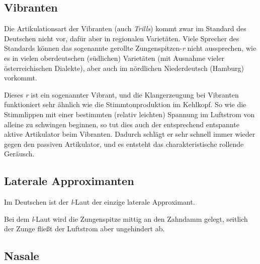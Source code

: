 \subsection[Vibranten]{\Opsional Vibranten}

Die Artikulationsart der Vibranten (auch \textit{Trills}) kommt zwar im Standard des Deutschen nicht vor, dafür aber in regionalen Varietäten.
Viele Sprecher des Standards können das sogenannte gerollte Zungenspitzen-\textit{r} nicht aussprechen, wie es in vielen oberdeutschen (südlichen) Varietäten (mit Ausnahme vieler österreichischen Dialekte), aber auch im nördlichen Niederdeutsch (\zB Hamburg) vorkommt.

Dieses \textit{r} ist ein sogenannter Vibrant, und die Klangerzeugung bei Vibranten funktioniert sehr ähnlich wie die Stimmtonproduktion im Kehlkopf.
So wie die Stimmlippen mit einer bestimmten (relativ leichten) Spannung im Luftstrom von alleine zu schwingen beginnen, so tut dies auch der entsprechend entspannte aktive Artikulator beim Vibranten.
Dadurch schlägt er sehr schnell immer wieder gegen den passiven Artikulator, und es entsteht das charakteristische rollende Geräusch.


\subsection{Laterale Approximanten}

Im Deutschen ist der \textit{l}-Laut der einzige laterale Approximant.


Bei dem \textit{l}-Laut wird die Zungenspitze mittig an den Zahndamm gelegt, seitlich der Zunge fließt der Luftstrom aber ungehindert ab.


\subsection{Nasale}

